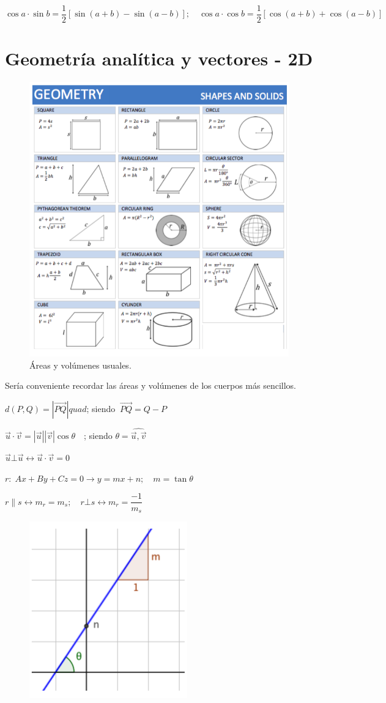 	$\cos a \cdot \sin b= \dfrac 1 2 [\sin(a+b)-\sin(a-b)]; \quad \cos a \cdot \cos b= \dfrac 1 2 [\cos(a+b)+\cos(a-b)]$
	
\section{Geometría analítica y vectores - 2D}
	
	\begin{figure}[H] 
		\label{araeas-volumenes}
		\centering
		\includegraphics[width=.5\textwidth]{imagenes/apendices/APENDICESIM07.png}
		\caption{Áreas y volúmenes usuales.}
	\end{figure}

Sería conveniente recordar las áreas y volúmenes de los cuerpos más sencillos.

\begin{multicols}{2}

$d(P,Q)=|\overrightarrow{PQ}| quad $; siendo $\ \overrightarrow{PQ}=Q-P$

$\vec u \cdot \vec v = |\vec u||\vec v|\cos \theta \quad $; siendo  $ \theta= \widehat {\vec u, \vec v  }$

$\vec u \bot  \vec u \leftrightarrow \vec u \cdot \vec v =0$

$r:\; Ax+By+Cz=0 \to y=mx+n; \quad m=\tan \theta$

$r \parallel s \leftrightarrow m_r=m_s; \quad r \bot s \leftrightarrow m_r=	\dfrac {-1}{m_s} $

	\begin{figure}[H] 
		\centering
		\includegraphics[width=0.3
		\textwidth]{imagenes/apendices/APENDICESIM08.png}
	\end{figure}
\end{multicols}

